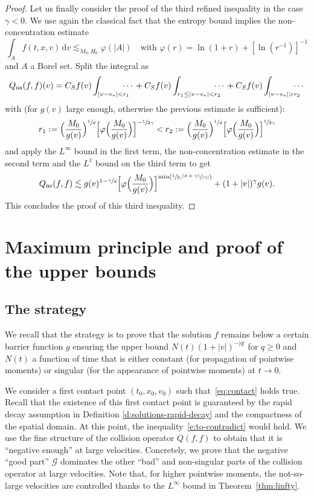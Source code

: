 \documentclass[JEP,XML,SOM,Unicode,NoFloatCountersInSection]{cedram}
\newcommand{\ns}{\mathrm{ns}}
\theoremstyle{plain}
\theoremstyle{definition}
\numberwithin{equation}{section}
\newcommand{\dd} {\, \mathrm{d}}
\begin{document}
\begin{proof}
Let us finally consider the proof of the third refined inequality in
the case $\gamma<0$. We use again the classical fact that the entropy
bound implies the non-concentration estimate
\[
\int_A f(t,x,v) \dd v \lesssim_{M_0,H_0} \varphi(|A|) \quad \mbox{
with } \varphi(r) = \ln(1+r) + \left[ \ln\left(r^{-1}\right) \right]^{-1}
\]
and $A$ a Borel set. Split the integral as
\begin{equation*}
Q_{\ns}(f,f)(v)
= C_S f(v) \int_{|v-v_*|< r_1} \hspace*{-10pt}\cdots{} + C_S f(v) \int_{r_1
\le |v-v_*|< r_2} \hspace*{-10pt}\cdots {}+ C_S f(v) \int_{|v-v_*| > r_2} \hspace*{-10pt}\cdots
\end{equation*}
with (for $g(v)$ large enough, otherwise the previous estimate is
sufficient):
\[
r_1 := \Bigl( \frac{M_0}{g(v)} \Bigr)^{\sfrac{1}{d}}
\Bigl[\varphi\Bigl(\frac{M_0}{g(v)}\Bigr)\Bigr]^{-\sfrac{1}{2\gamma}}
< r_2 := \Bigl( \frac{M_0}{g(v)} \Bigr)^{\sfrac{1}{d}}
\Bigl[\varphi\Bigl(\frac{M_0}{g(v)}\Bigr)\Bigr]^{\sfrac{1}{2\gamma}}
\]
and apply the $L^\infty$ bound in the first term, the
non-concentration estimate in the second term and the $L^1$ bound on
the third term to get
\[
Q_{\ns}(f,f) \lesssim g(v)^{1-\sfrac{\gamma}{d}}
\Bigl[\varphi\Bigl(\frac{M_0}{g(v)}\Bigr)\Bigr]^{\min\left(\sfrac{1}{2},\sfrac{(d+\gamma)}{|\gamma|}\right)}
+ (1+|v|)^\gamma g(v).
\]
This concludes the proof of this third inequality.
\end{proof}

\section{Maximum principle and proof of the upper bounds}
\label{s:proof}

\subsection{The strategy}

We recall that the strategy is to prove that the solution $f$ remains
below a certain barrier function $g$ ensuring the upper bound
$N(t) (1+|v|)^{-|q|}$ for $q \ge 0$ and $N(t)$ a function of time that
is either constant (for propagation of pointwise moments) or singular
(for the appearance of pointwise moments) at $t \to 0$.

We consider a first contact point $(t_0,x_0,v_0)$ such
that~\eqref{eq:contact} holds true. Recall that the existence of this first contact point is guaranteed by the rapid decay assumption in Definition \ref{d:solutions-rapid-decay} and the compactness of the spatial domain. At this point, the inequality~\eqref{e:to-contradict} would hold. We use the fine structure of the collision operator $Q(f,f)$ to obtain that it is ``negative enough'' at large velocities. Concretely, we prove that the
negative ``good part'' $\mathcal{G}$ dominates the other ``bad'' and non-singular parts of the collision operator at large velocities. Note that, for higher pointwise moments, the not-so-large velocities are controlled thanks to the $L^\infty$ bound in Theorem~\ref{thm:linfty}.
\end{document}
